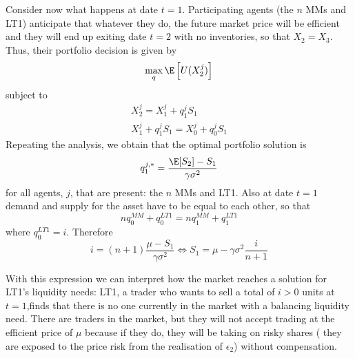 \documentclass[11pt]{article}
\begin{document}
Consider now what happens at date \(t=1\). Participating agents (the \(n\) MMs and LT1) anticipate
that whatever they do, the future market price will be efficient and they will end up exiting date
\(t=2\) with no inventories, so that \(X_2=X_3\). Thus, their portfolio decision is given by
\begin{equation*}
\max_q\E\left[ U(X_2^j) \right]
\end{equation*}
subject to
\begin{gather*}
X_2^j=X_1^j+q_1^jS_1\\
X_1^j+q_1^jS_1=X_0^j+q_0^jS_1
\end{gather*}
Repeating the analysis, we obtain that the optimal portfolio solution is
\begin{equation*}
q_1^{j,*}=\frac{\E[S_2]-S_1}{\gamma\sigma^2}
\end{equation*}
for all agents, \(j\), that are present: the \(n\) MMs and LT1. Also at date \(t=1\) demand and supply
for the asset have to be equal to each other, so that
\begin{equation*}
nq_0^{MM}+q_0^{LT1}=nq_1^{MM}+q_1^{LT1}
\end{equation*}
where \(q_0^{LT1}=i\). Therefore
\begin{equation*}
i=(n+1)\frac{\mu-S_1}{\gamma\sigma^2}\Longleftrightarrow S_1=\mu-\gamma\sigma^2\frac{i}{n+1}
\end{equation*}

With this expression we can interpret how the market reaches a solution for LT1's liquidity needs:
LT1, a trader who wants to sell a total of \(i>0\) units at \(t=1\),finds that there is no one
currently in the market with a balancing liquidity need. There are traders in the market, but they
will not accept trading at the efficient price of \(\mu\) because if they do, they will be taking on
risky shares ( they are exposed to the price risk from the realisation of \(\epsilon_2\)) without compensation.
\end{document}
